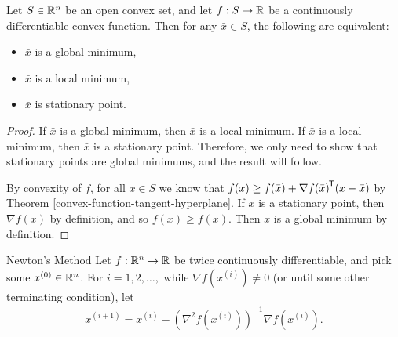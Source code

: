\begin{prop}
    Let $S \in \mathbb{R}^n$ be an open convex set, and let $f: S \to \mathbb{R}$ be a continuously differentiable convex function. Then for any $\bar{x} \in S$, the following are equivalent:
    \begin{itemize}
        \item $\bar{x}$ is a global minimum,
        \item $\bar{x}$ is a local minimum,
        \item $\bar{x}$ is stationary point.
    \end{itemize}
\end{prop}

\begin{proof}
    If $\bar{x}$ is a global minimum, then $\bar{x}$ is a local minimum. If $\bar{x}$ is a local minimum, then $\bar{x}$ is a stationary point. Therefore, we only need to show that stationary points are global minimums, and the result will follow.

    By convexity of $f$, for all $x \in S$ we know that $f(x) \geq f(\bar{x}) + {\nabla f(\bar{x})}^{\mkern-1.5mu\mathsf{T}}(x - \bar{x})$ by Theorem \ref{convex-function-tangent-hyperplane}. If $\bar{x}$ is a stationary point, then $\nabla f(\bar{x})$ by definition, and so $f(x) \geq f(\bar{x})$. Then $\bar{x}$ is a global minimum by definition.
\end{proof}

\begin{defn}{Newton's Method}\label{newtons-method}\proofbreak
    Let $f: \mathbb{R}^n \to \mathbb{R}$ be twice continuously differentiable, and pick some $x^{(0)} \in \mathbb{R}^n$. For $i = 1, 2, \ldots, $ while $\nabla f(x^{(i)}) \neq 0$ (or until some other terminating condition), let
    \begin{align*}
        x^{(i+1)} = x^{(i)} - \left(\nabla^2f(x^{(i)})\right)^{-1}\nabla f(x^{(i)}).
    \end{align*}
\end{defn}

